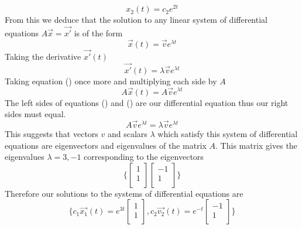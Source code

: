 {\[x_2(t) = c_2e^{2t}\]
From this we deduce that the solution to any linear system of differential equations $A\vec{x} = \vec{x'}$ is of the form 
\[\vec{x}(t) = \vec{v}e^{\lambda t}\]
Taking the derivative $\vec{x'}(t)$
\[\vec{x'}(t) = \lambda \vec{v}e^{\lambda t}\]
Taking equation () once more and multiplying each side by $A$
\[A \vec{x}(t) = A \vec{v}e^{\lambda t}\]
The left sides of equations () and () are our differential equation thus our right sides must equal.
\[A\vec{v}e^{\lambda t} = \lambda \vec{v}e^{\lambda t}\]
This suggests that vectors $v$ and scalars $\lambda$ which satisfy this system of differential equations are eigenvectors and eigenvalues of the matrix $A$.
\example{
\[\frac{dx}{dt} = \begin{bmatrix}
    2 & 1 \\
    1 & 2 \\
\end{bmatrix} x\]
}
This matrix gives the eigenvalues $\lambda = 3, -1$ corresponding to the eigenvectors
\[\{\begin{bmatrix}
    1 \\
    1 \\
\end{bmatrix}
\begin{bmatrix}
    -1 \\
    1 \\
\end{bmatrix}\}\]
Therefore our solutions to the systems of differential equations are
\[\{c_1\vec{x_1}(t) = e^{3t} \begin{bmatrix}
    1 \\
    1 \\
\end{bmatrix},
c_2\vec{v_2}(t) = e^{-t}\begin{bmatrix}
    -1 \\
    1 \\
\end{bmatrix}\}\]

}
